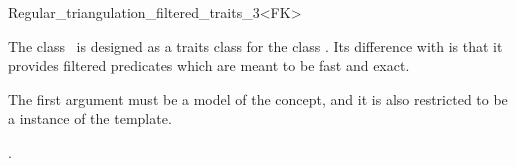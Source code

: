 

\begin{ccRefClass}{Regular_triangulation_filtered_traits_3<FK>}

\ccDefinition
  
The class \ccRefName\ is designed as a traits class for the
class . 
Its difference with  is that it
provides filtered predicates which are meant to be fast and exact.

The first argument  must be a model of the  concept, and
it is also restricted to be a instance of the  template.


\ccIsModel
{}






\ccSeeAlso

.

\end{ccRefClass}
